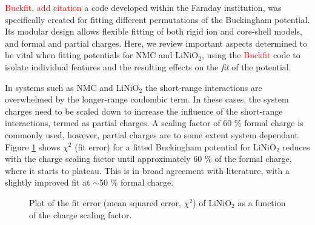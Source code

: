 \documentclass[aps,prb,twocolumn,superscriptaddress,reprint]{revtex4-1}
\newcommand{\re}[1]{\textcolor{red}{#1}}
\begin{document}
\re{Buckfit}, \re{ add citation\cite{}} a code developed within the Faraday institution, was specifically created for fitting different permutations of the Buckingham potential. Its modular design allows flexible fitting of both rigid ion and core-shell models, and formal and partial charges. Here, we review important aspects determined to be vital when fitting potentials for NMC and LiNiO$_2$, using the \re{Buckfit} code to isolate individual features and the resulting effects on the \textit{fit} of the potential.

In systems such as NMC and LiNiO$_2$ the short-range interactions are overwhelmed by the longer-range coulombic term. In these cases, the system charges need to be scaled down to increase the influence of the short-range interactions, termed as partial charges. A scaling factor of 60 \% formal charge is commonly used, \cite{pedone2006potentials} however, partial charges are to some extent system dependant. Figure \ref{fig:charge_scaling} shows $\chi^2$ (fit error) for a fitted Buckingham potential for LiNiO$_2$ reduces with the charge scaling factor until approximately 60 \% of the formal charge, where it starts to plateau. This is in broad agreement with literature, with a slightly improved fit at $\sim$50 \% formal charge.

\begin{figure}[h]
    \centering
    \caption{\label{fig:charge_scaling} Plot of the fit error (mean squared error, $\chi^2$) of LiNiO$_2$ as a function of the charge scaling factor.}
\end{figure}
\end{document}
